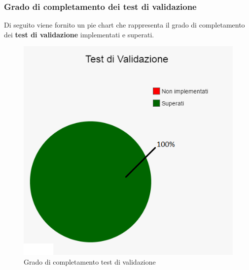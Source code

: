 	\subsubsection{Grado di completamento dei test di validazione}
	Di seguito viene fornito un pie chart che rappresenta il grado di completamento dei \textbf{test di validazione} implementati e superati.
	\begin{figure}[H]
		\centering
		\includegraphics[scale=0.7]{includes/img/test_validazione.png}
		\caption{Grado di completamento test di validazione}
	\end{figure}
	
	\clearpage